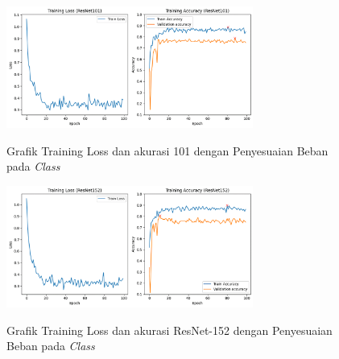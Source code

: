 \begin{figure}[hbtp]
	{\includegraphics[height=4cm]{gambar/TrainingGraphResNet101class-weighted.png}}
	\caption{Grafik Training Loss dan akurasi 101 dengan Penyesuaian Beban pada \emph{Class}}
	\label{fig:graphTrainingWeightedPt4}
\end{figure}
\begin{figure}[hbtp]
	\centering
	{\includegraphics[height=4cm]{gambar/TrainingGraphResNet152class-weighted.png}}
	\caption{Grafik Training Loss dan akurasi ResNet-152 dengan Penyesuaian Beban pada \emph{Class}}
	\label{fig:graphTrainingWeightedPt5}
\end{figure}

